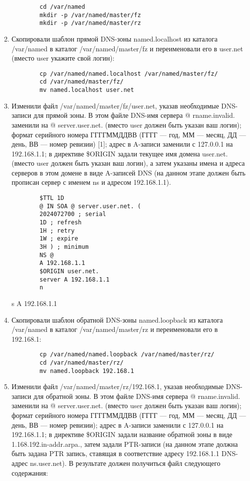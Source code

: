 \begin{enumerate}
        \begin{verbatim}
        cd /var/named
        mkdir -p /var/named/master/fz
        mkdir -p /var/named/master/rz
        \end{verbatim}
    \item Скопировали шаблон прямой DNS-зоны named.localhost из каталога /var/named в каталог /var/named/master/fz и переименовали его в user.net (вместо user укажите свой логин):
        \begin{verbatim}
        cp /var/named/named.localhost /var/named/master/fz/
        cd /var/named/master/fz/
        mv named.localhost user.net
        \end{verbatim}
    \item Изменили файл /var/named/master/fz/user.net, указав необходимые DNS-записи для прямой зоны. В этом файле DNS-имя сервера @ rname.invalid. заменили на @ server.user.net. (вместо user должен быть указан ваш логин); формат серийного номера ГГГГММДДВВ (ГГГГ — год, ММ — месяц, ДД — день, ВВ — номер ревизии) [1]; адрес в A-записи заменили с 127.0.0.1 на 192.168.1.1; в директиве \$ORIGIN задали текущее имя домена user.net. (вместо user должен быть указан ваш логин), а затем указаны имена и адреса серверов в этом домене в виде A-записей DNS (на данном этапе должен быть прописан сервер с именем ns и адресом 192.168.1.1).
        \begin{verbatim}
        $TTL 1D
        @ IN SOA @ server.user.net. (
        2024072700 ; serial
        1D ; refresh
        1H ; retry
        1W ; expire
        3H ) ; minimum
        NS @
        A 192.168.1.1
        $ORIGIN user.net.
        server A 192.168.1.1
        n\end{verbatim}
        s A 192.168.1.1
    \item Скопировали шаблон обратной DNS-зоны named.loopback из каталога /var/named в каталог /var/named/master/rz и переименовали его в 192.168.1:
        \begin{verbatim}
        cp /var/named/named.loopback /var/named/master/rz/
        cd /var/named/master/rz/
        mv named.loopback 192.168.1
        \end{verbatim}
    \item Изменили файл /var/named/master/rz/192.168.1, указав необходимые DNS-записи для обратной зоны. В этом файле DNS-имя сервера @ rname.invalid. заменили на @ server.user.net. (вместо user должен быть указан ваш логин); формат серийного номера ГГГГММДДВВ (ГГГГ — год, ММ — месяц, ДД — день, ВВ — номер ревизии); адрес в A-записи заменили с 127.0.0.1 на 192.168.1.1; в директиве \$ORIGIN задали название обратной зоны в виде 1.168.192.in-addr.arpa., затем задали PTR-записи (на данном этапе должна быть задана PTR запись, ставящая в соответствие адресу 192.168.1.1 DNS-адрес ns.user.net). В результате должен получиться файл следующего содержания:

\end{enumerate}
